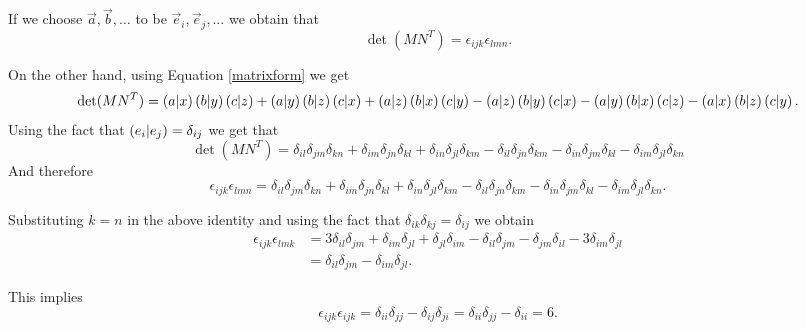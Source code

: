 \documentclass[10pt]{article}
\begin{document}
    If we choose $\vec a, \vec b, \dots$ to be $\vec e_i, \vec e_j, \dots$ we obtain that 
    \begin{displaymath}
      \det (MN^T) = \epsilon_{ijk} \epsilon_{lmn}.
    \end{displaymath}

    On the other hand, using Equation \ref{matrixform} we get
    \begin{displaymath}
      \det (M N^T) = \left(a|x\right) \left(b|y\right) \left(c|z\right) + 
      \left(a|y\right) \left(b|z\right) \left(c|x\right) +
      \left(a|z\right) \left(b|x\right) \left(c|y\right) - 
      \left(a|z\right) \left(b|y\right) \left(c|x\right) - 
      \left(a|y\right) \left(b|x\right) \left(c|z\right) - 
      \left(a|x\right) \left(b|z\right) \left(c|y\right).
    \end{displaymath}
    Using the fact that $\left(e_i|e_j\right) = \delta_{ij}$ we get that
    \begin{displaymath}
      \det (M N^T) = \delta_{il} \delta_{jm} \delta_{kn} 
      + \delta_{im} \delta_{jn} \delta_{kl} 
      + \delta_{in} \delta_{jl} \delta_{km} 
      - \delta_{il} \delta_{jn} \delta_{km} 
      - \delta_{in} \delta_{jm} \delta_{kl} 
      - \delta_{im} \delta_{jl} \delta_{kn} 
    \end{displaymath}
    And therefore 
    \begin{displaymath}
      \epsilon_{ijk} \epsilon_{lmn} = 
      \delta_{il} \delta_{jm} \delta_{kn} 
      + \delta_{im} \delta_{jn} \delta_{kl} 
      + \delta_{in} \delta_{jl} \delta_{km} 
      - \delta_{il} \delta_{jn} \delta_{km} 
      - \delta_{in} \delta_{jm} \delta_{kl} 
      - \delta_{im} \delta_{jl} \delta_{kn}.
    \end{displaymath}

    Substituting $k = n$ in the above identity and using the fact that $\delta_{ik}\delta_{kj} = \delta_{ij}$ we obtain
    \begin{align*}
      \epsilon_{ijk} \epsilon_{lmk} &= 
      3\delta_{il} \delta_{jm} 
      + \delta_{im} \delta_{jl} 
      + \delta_{jl} \delta_{im} 
      - \delta_{il} \delta_{jm} 
      - \delta_{jm} \delta_{il}
      - 3\delta_{im} \delta_{jl} \\
      &= \delta_{il} \delta_{jm} - \delta_{im}\delta_{jl}.
    \end{align*}

    This implies 
    \begin{displaymath}
      \epsilon_{ijk} \epsilon_{ijk} = \delta_{ii} \delta_{jj} - \delta_{ij} \delta_{ji} = 
      \delta_{ii} \delta_{jj} - \delta_{ii} = 6.
    \end{displaymath}
    
\end{document}
